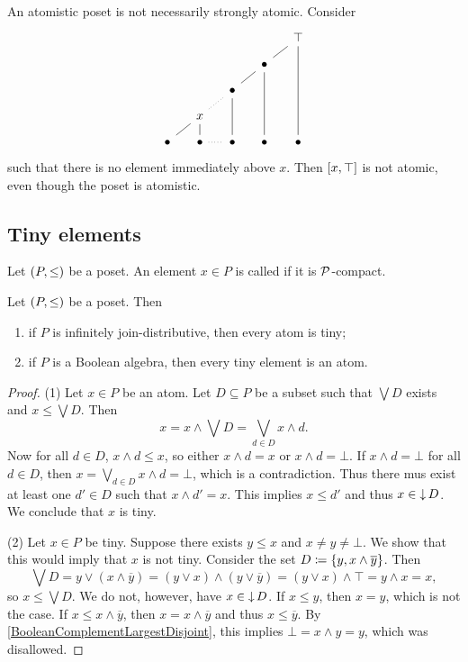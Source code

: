 \begin{example}
An atomistic poset is not necessarily strongly atomic. Consider
\[ \begin{tikzcd}[column sep=small, row sep=small]
&&&& {\top} \ar[dddd, dash] \\
&&& {\bullet} \ar[ur, dash] \ar[ddd, dash] & \\
&& {\bullet} \ar[ur, dash] \ar[dd, dash] && \\
& {x} \ar[ur, dotted, no head] \ar[d, dash] &&& \\
{\bullet} \ar[ur, dash] & {\bullet} \ar[r, dotted, no head] & {\bullet} & {\bullet} & {\bullet}
\end{tikzcd} \]
such that there is no element immediately above $x$. Then $\interval{x,\top}$ is not atomic, even though the poset is atomistic.
\end{example}

\subsection{Tiny elements}
\begin{definition}
Let $\sSet{P,\leq}$ be a poset. An element $x\in P$ is called  if it is $\operatorname{\mathcal{P}}$-compact.
\end{definition}

\begin{proposition}
Let $\sSet{P,\leq}$ be a poset. Then
\begin{enumerate}
\item if $P$ is infinitely join-distributive, then every atom is tiny;
\item if $P$ is a Boolean algebra, then every tiny element is an atom.
\end{enumerate}
\end{proposition}
\begin{proof}
(1) Let $x\in P$ be an atom. Let $D\subseteq P$ be a subset such that $\bigvee D$ exists and $x \leq \bigvee D$. Then
\[ x = x\wedge \bigvee D = \bigvee_{d\in D}x\wedge d. \]
Now for all $d\in D$, $x\wedge d \leq x$, so either $x\wedge d = x$ or $x\wedge d = \bot$. If $x\wedge d = \bot$ for all $d\in D$, then $x =  \bigvee_{d\in D}x\wedge d = \bot$, which is a contradiction. Thus there mus exist at least one $d'\in D$ such that $x\wedge d' = x$. This implies $x\leq d'$ and thus $x\in \operatorname{\downarrow} D$. We conclude that $x$ is tiny.

(2) Let $x\in P$ be tiny. Suppose there exists $y \leq x$ and $x \neq y \neq \bot$. We show that this would imply that $x$ is not tiny. Consider the set $D \coloneqq \{y, x\wedge \overline{y}\}$. Then
\[ \bigvee D = y \vee (x\wedge \overline{y}) = (y\vee x)\wedge (y\vee \overline{y}) = (y\vee x)\wedge \top = y\wedge x = x, \]
so $x \leq \bigvee D$. We do not, however, have $x\in \operatorname{\downarrow} D$. If $x \leq y$, then $x=y$, which is not the case. If $x \leq x\wedge \overline{y}$, then $x = x\wedge \overline{y}$ and thus $x \leq \overline{y}$. By \ref{BooleanComplementLargestDisjoint}, this implies $\bot = x\wedge y = y$, which was disallowed.
\end{proof}

